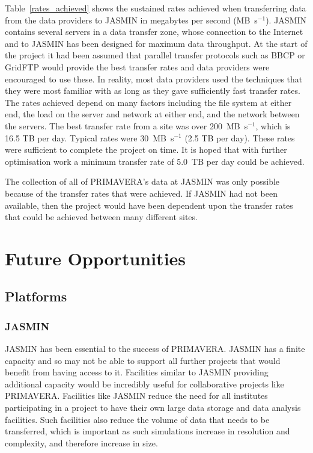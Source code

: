 \documentclass[gmd, manuscript]{copernicus}
\begin{document}
Table~\ref{rates_achieved} shows the sustained rates achieved when transferring data from the data providers to JASMIN in megabytes per second (MB~s$^{-1}$). JASMIN contains several servers in a data transfer zone, whose connection to the Internet and to JASMIN has been designed for maximum data throughput. At the start of the project it had been assumed that parallel transfer protocols such as BBCP or GridFTP would provide the best transfer rates and data providers were encouraged to use these. In reality, most data providers used the techniques that they were most familiar with as long as they gave sufficiently fast transfer rates. The rates achieved depend on many factors including the file system at either end, the load on the server and network at either end, and the network between the servers. The best transfer rate from a site was over 200~MB~s$^{-1}$, which is 16.5 TB per day. Typical rates were 30~MB~s$^{-1}$ (2.5 TB per day). These rates were sufficient to complete the project on time. It is hoped that with further optimisation work a minimum transfer rate of 5.0~TB per day could be achieved.

The collection of all of PRIMAVERA's data at JASMIN was only possible because of the transfer rates that were achieved. If JASMIN had not been available, then the project would have been dependent upon the transfer rates that could be achieved between many different sites.


\section{Future Opportunities}

\subsection{Platforms}

\subsubsection{JASMIN}
JASMIN has been essential to the success of PRIMAVERA. JASMIN has a finite capacity and so may not be able to support all further projects that would benefit from having access to it. Facilities similar to JASMIN providing additional capacity would be incredibly useful for collaborative projects like PRIMAVERA. Facilities like JASMIN reduce the need for all institutes participating in a project to have their own large data storage and data analysis facilities. Such facilities also reduce the volume of data that needs to be transferred, which is important as such simulations increase in resolution and complexity, and therefore increase in size.
\end{document}
